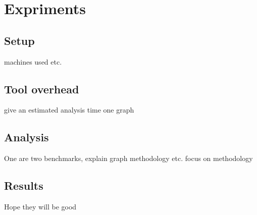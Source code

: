 \section{Expriments}
\label{sec:expe}
\subsection{Setup}
\label{sec:expe-setup}
machines used etc.
\subsection{Tool overhead}
\label{sec:expe-overhead}
give an estimated analysis time one graph
\subsection{Analysis}
\label{sec:expe-analysis}
One are two benchmarks, explain graph methodology etc.
focus on methodology
\subsection{Results}
\label{sec:expe-results}
Hope they will be good
